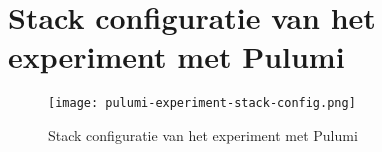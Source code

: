 \section{Stack configuratie van het experiment met Pulumi}\label{appendix:stack-configuration-from-experiment-with-pulumi}
\begin{figure}[hbt!]
  \centering
  \texttt{[image: pulumi-experiment-stack-config.png]}
  \caption{Stack configuratie van het experiment met Pulumi}
  \label{fig:pulumi-experiment-stack-config}
\end{figure}

\newpage